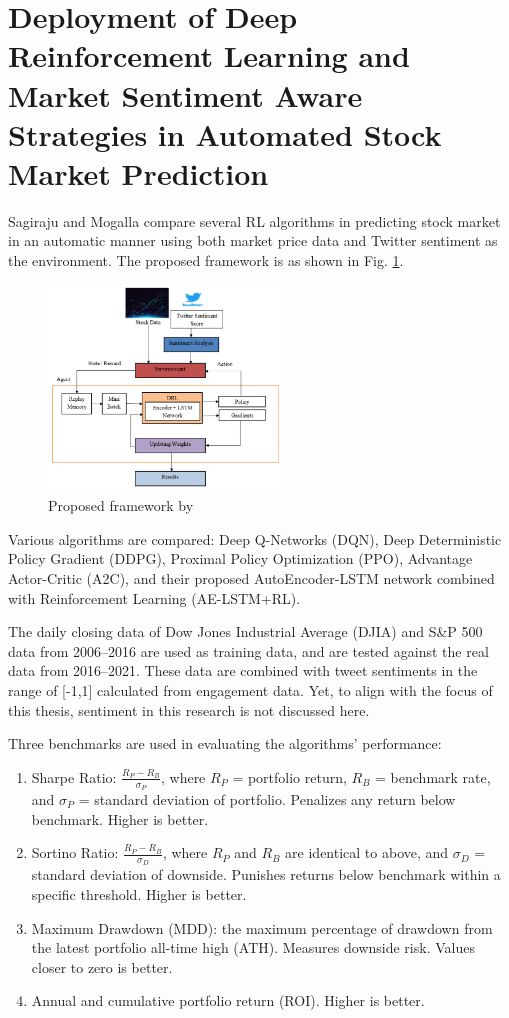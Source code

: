 \section{Deployment of Deep Reinforcement Learning and Market Sentiment Aware Strategies in Automated Stock Market Prediction} %
Sagiraju and Mogalla \cite{LV41} compare several RL algorithms in predicting stock market in an automatic manner using both market price data and Twitter sentiment as the environment. The proposed framework is as shown in Fig. \ref{fig:lv4101}.

\begin{figure}[h]
    \centering
    \includegraphics[width=0.55\textwidth]{graphics/2lv4101.png}
    \caption{Proposed framework by \cite{LV41}}
    \label{fig:lv4101}
\end{figure}

Various algorithms are compared: Deep Q-Networks (DQN), Deep Deterministic Policy Gradient (DDPG), Proximal Policy Optimization (PPO), Advantage Actor-Critic (A2C), and their proposed AutoEncoder-LSTM network combined with Reinforcement Learning (AE-LSTM+RL).

The daily closing data of Dow Jones Industrial Average (DJIA) and S\&P 500 data from 2006--2016 are used as training data, and are tested against the real data from 2016--2021. These data are combined with tweet sentiments in the range of [-1,1] calculated from engagement data. Yet, to align with the focus of this thesis, sentiment in this research is not discussed here.

Three benchmarks are used in evaluating the algorithms' performance: 
\begin{enumerate}
	\item Sharpe Ratio: $\frac{R_P-R_B}{\sigma_P}$, where $R_P$ = portfolio return, $R_B$ = benchmark rate, and $\sigma_P$ = standard deviation of portfolio. Penalizes any return below benchmark. Higher is better.
	\item Sortino Ratio: $\frac{R_P-R_B}{\sigma_D}$, where $R_P$ and $R_B$ are identical to above, and $\sigma_D$ = standard deviation of downside. Punishes returns below benchmark within a specific threshold. Higher is better.
	\item Maximum Drawdown (MDD): the maximum percentage of drawdown from the latest portfolio all-time high (ATH). Measures downside risk. Values closer to zero is better.
	\item Annual and cumulative portfolio return (ROI). Higher is better.
\end{enumerate}

